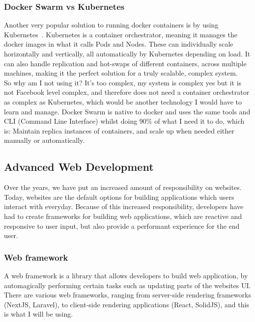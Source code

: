 \documentclass[titlepage]{article}
\begin{document}
\subsubsection{Docker Swarm vs Kubernetes}
Another very popular solution to running docker containers is by using Kubernetes~\cite{kubernetes}. Kubernetes is a container orchestrator, meaning it manages the docker images in what it calls Pods and Nodes. These can individually scale horizontally and vertically, all automatically by Kubernetes depending on load. It can also handle replication and hot-swaps of different containers, across multiple machines, making it the perfect solution for a truly scalable, complex system. \\

So why am I not using it? It's too complex, my system is complex yes but it is not Facebook level complex, and therefore does not need a container orchestrator as complex as Kubernetes, which would be another technology I would have to learn and manage. Docker Swarm is native to docker and uses the same tools and CLI (Command Line Interface) whilst doing 90\% of what I need it to do, which is: Maintain replica instances of containers, and scale up when needed either manually or automatically. \\

\subsection{Advanced Web Development}
Over the years, we have put an increased amount of responsibility on websites. Today, websites are the default options for building applications which users interact with everyday. Because of this increased responsibility, developers have had to create frameworks for building web applications, which are reactive and responsive to user input, but also provide a performant experience for the end user.

\subsubsection{Web framework}
A web framework is a library that allows developers to build web application, by automagically performing certain tasks such as updating parts of the websites UI. There are various web frameworks, ranging from server-side rendering frameworks (NextJS, Laravel), to client-side rendering applications (React, SolidJS), and this is what I will be using. \\
\end{document}
